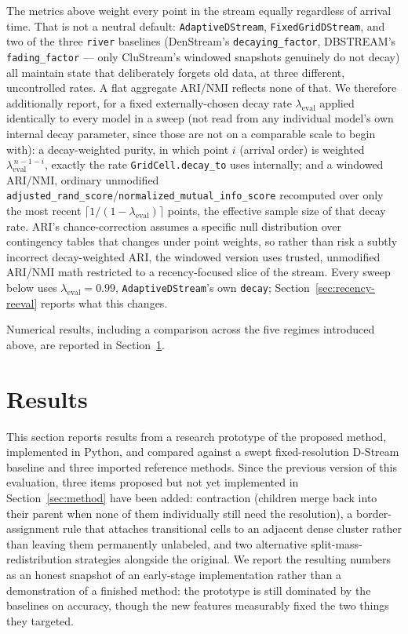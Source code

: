 \documentclass[11pt]{article}
\begin{document}
The metrics above weight every point in the stream equally regardless of arrival time. That is not a neutral default: \texttt{AdaptiveDStream}, \texttt{FixedGridDStream}, and two of the three \texttt{river} baselines (DenStream's \texttt{decaying\_factor}, DBSTREAM's \texttt{fading\_factor} — only CluStream's windowed snapshots genuinely do not decay) all maintain state that deliberately forgets old data, at three different, uncontrolled rates. A flat aggregate ARI/NMI reflects none of that. We therefore additionally report, for a fixed externally-chosen decay rate $\lambda_{\text{eval}}$ applied identically to every model in a sweep (not read from any individual model's own internal decay parameter, since those are not on a comparable scale to begin with): a decay-weighted purity, in which point $i$ (arrival order) is weighted $\lambda_{\text{eval}}^{\,n-1-i}$, exactly the rate \texttt{GridCell.decay\_to} uses internally; and a windowed ARI/NMI, ordinary unmodified \texttt{adjusted\_rand\_score}/\texttt{normalized\_mutual\_info\_score} recomputed over only the most recent $\lceil 1/(1-\lambda_{\text{eval}})\rceil$ points, the effective sample size of that decay rate. ARI's chance-correction assumes a specific null distribution over contingency tables that changes under point weights, so rather than risk a subtly incorrect decay-weighted ARI, the windowed version uses trusted, unmodified ARI/NMI math restricted to a recency-focused slice of the stream. Every sweep below uses $\lambda_{\text{eval}} = 0.99$, \texttt{AdaptiveDStream}'s own \texttt{decay}; Section~\ref{sec:recency-reeval} reports what this changes.

Numerical results, including a comparison across the five regimes introduced above, are reported in Section~\ref{sec:results}.

\section{Results}
\label{sec:results}

This section reports results from a research prototype of the proposed method, implemented in Python, and compared against a swept fixed-resolution D-Stream baseline and three imported reference methods. Since the previous version of this evaluation, three items proposed but not yet implemented in Section~\ref{sec:method} have been added: contraction (children merge back into their parent when none of them individually still need the resolution), a border-assignment rule that attaches transitional cells to an adjacent dense cluster rather than leaving them permanently unlabeled, and two alternative split-mass-redistribution strategies alongside the original. We report the resulting numbers as an honest snapshot of an early-stage implementation rather than a demonstration of a finished method: the prototype is still dominated by the baselines on accuracy, though the new features measurably fixed the two things they targeted.
\end{document}
